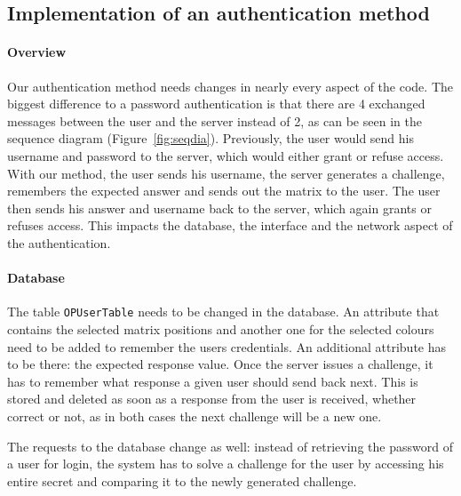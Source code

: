 \documentclass[11pt,a4paper]{article}
\begin{document}
\clearpage

\subsection*{Implementation of an authentication method}
\paragraph{Overview}
Our authentication method needs changes in nearly every aspect of the code. The biggest difference to a password authentication is that there are 4 exchanged messages between the user and the server instead of 2, as can be seen in the sequence diagram (Figure~\ref{fig:seqdia}). Previously, the user would send his username and password to the server, which would either grant or refuse access. With our method, the user sends his username, the server generates a challenge, remembers the expected answer and sends out the matrix to the user. The user then sends his answer and username back to the server, which again grants or refuses access. This impacts the database, the interface and the network aspect of the authentication.

\paragraph{Database}
The table \texttt{OPUserTable} needs to be changed in the database.
An attribute that contains the selected matrix positions and another one for the selected colours need to be added to remember the users credentials.
An additional attribute has to be there: the expected response value. Once the server issues a challenge, it has to remember what response a given user should send back next. This is stored and deleted as soon as a response from the user is received, whether correct or not, as in both cases the next challenge will be a new one.

The requests to the database change as well: instead of retrieving the password of a user for login, the system has to solve a challenge for the user by accessing his entire secret and comparing it to the newly generated challenge.
\end{document}
